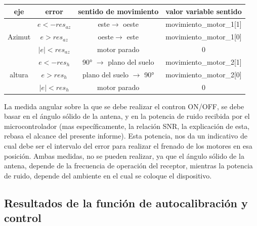  \begin{table}[ht]
 	\centering 
 	\begin{tabular}{|c|c|c|c|}
 		\hline 
 		eje & error & sentido de movimiento & valor variable sentido \\ 
 		\hline	 
 		\multirow{3}{*}{Azimut}& $e<-res_{az}$ & este$\rightarrow$ oeste  &movimiento\_motor\_1[1] \\ \cline{2-4}
 		& $e>res_{az}$& oeste$\rightarrow$ este& movimiento\_motor\_1[0] \\ \cline{2-4}
 		& $|e|<res_{az}$& motor parado & 0\\ \cline{2-4}
 		\hline   
 		\multirow{3}{*}{altura}& $e<-res_h $ &90° $\rightarrow$ plano del suelo& movimiento\_motor\_2[1] \\ \cline{2-4}
 		& $e>res_h$ &plano del suelo $\rightarrow$ 90° & movimiento\_motor\_2[0] \\ \cline{2-4}
 		& $|e|<res_h$& motor parado& 0\\ 
 		\hline
 		  			
  	\end{tabular}
 \end{table}  
 
La medida angular sobre la que se debe realizar el contron ON/OFF, se debe basar en el ángulo sólido de la antena, y en la potencia de ruido recibida por el microcontrolador (mas específicamente, la relación SNR, la explicación de esta, rebasa el alcance del presente informe). Esta potencia, nos da un indicativo de cual debe ser el intervalo del error para realizar el frenado de los motores en esa posición. Ambas medidas, no se pueden realizar, ya que el ángulo sólido de la antena, depende de la frecuencia de operación del receptor, mientras la potencia de ruido, depende del ambiente en el cual se coloque el dispositivo.   
 

\subsection{Resultados de la función de autocalibración y control}


